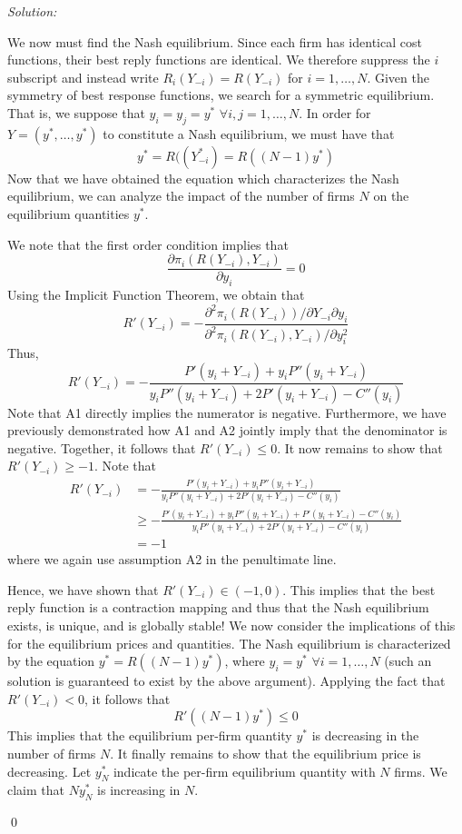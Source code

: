 \documentclass[12pt]{article}
\newenvironment{sol}
    {\emph{Solution:}
    }
    {
    \qed
    }
\begin{document}
\begin{sol}
\begin{enumerate}[label=\alph*)]
    We now must find the Nash equilibrium. Since each firm has identical cost functions, their best reply functions are identical. We therefore suppress the $i$ subscript and instead write $R_{i}(Y_{-i}) = R(Y_{-i})$ for $i=1,\ldots, N$. Given the symmetry of best response functions, we search for a symmetric equilibrium. That is, we suppose that $y_i = y_{j} = y^*$ $\forall i,j = 1,\ldots,N$. In order for $Y = (y^*, \ldots, y^*)$ to constitute a Nash equilibrium, we must have that 
    \[y^* = R((Y_{-i}^*) = R((N-1)y^*)\]
    Now that we have obtained the equation which characterizes the Nash equilibrium, we can analyze the impact of the number of firms $N$ on the equilibrium quantities $y^*$. 
    
    We note that the first order condition implies that
    \[\frac{\partial \pi_i(R(Y_{-i}), Y_{-i})}{\partial y_i} = 0\]
    Using the Implicit Function Theorem, we obtain that
    \[R'(Y_{-i}) = -\frac{\partial^2 \pi_i(R(Y_{-i}))/\partial Y_{-i} \partial y_i}{\partial^2 \pi_i(R(Y_{-i}), Y_{-i})/\partial y_i^2}\]
    Thus,
    \[R'(Y_{-i}) = -\frac{P'(y_i + Y_{-i}) + y_i P''(y_i + Y_{-i})}{y_i P''(y_i + Y_{-i}) + 2 P'(y_i + Y_{-i}) - C''(y_i)}\]
    Note that A1 directly implies the numerator is negative. Furthermore, we have previously demonstrated how A1 and A2 jointly imply that the denominator is negative. Together, it follows that $R'(Y_{-i}) \leq 0$. It now remains to show that $R'(Y_{-i}) \geq -1$. Note that
    \begin{align*}
        R'(Y_{-i}) &= -\frac{P'(y_i + Y_{-i}) + y_i P''(y_i + Y_{-i})}{y_i P''(y_i + Y_{-i}) + 2 P'(y_i + Y_{-i}) - C''(y_i)}\\
        &\geq -\frac{P'(y_i + Y_{-i}) + y_i P''(y_i + Y_{-i}) + P'(y_i + Y_{-i}) - C''(y_i)}{y_i P''(y_i + Y_{-i}) + 2 P'(y_i + Y_{-i}) - C''(y_i)}\\
        &= -1
    \end{align*} 
    where we again use assumption A2 in the penultimate line.

    Hence, we have shown that $R'(Y_{-i}) \in (-1, 0)$. This implies that the best reply function is a contraction mapping and thus that the Nash equilibrium exists, is unique, and is globally stable! We now consider the implications of this for the equilibrium prices and quantities. The Nash equilibrium is characterized by the equation $y^* = R((N-1)y^*)$, where $y_i = y^*$ $\forall i=1,\ldots, N$ (such an solution is guaranteed to exist by the above argument). Applying the fact that $R'(Y_{-i}) < 0$, it follows that
    \[R'((N-1)y^*) \leq 0\]
    This implies that the equilibrium per-firm quantity $y^*$ is decreasing in the number of firms $N$. It finally remains to show that the equilibrium price is decreasing. Let $y^*_N$ indicate the per-firm equilibrium quantity with $N$ firms. We claim that $Ny^*_N$ is increasing in $N$.


\end{enumerate}
\end{sol}
\end{document}
